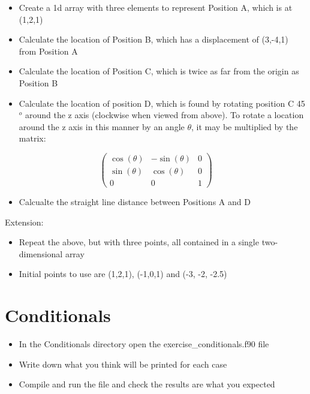 \documentclass[11pt,a4paper]{article}
\begin{document}
\begin{itemize}
    \item Create a 1d array with three elements to represent Position A, which is at (1,2,1)
    \item Calculate the location of Position B, which has a displacement of (3,-4,1) from Position A
    \item Calculate the location of Position C, which is twice as far from the origin as Position B
    \item Calculate the location of position D, which is found by rotating position C 45$^{o}$ around the z axis (clockwise when viewed from above). To rotate a location around the z axis in this manner by an angle $\theta$, it may be multiplied by the matrix:
\end{itemize}

\begin{equation}
\begin{pmatrix}
\cos{(\theta)} & -\sin{(\theta)} & 0\\
\sin{(\theta)} & \cos{(\theta)} & 0 \\
0 & 0 & 1
\end{pmatrix}
\end{equation}

\begin{itemize}
    \item Calcualte the straight line distance between Positions A and D
\end{itemize}

Extension:
\begin{itemize}
    \item Repeat the above, but with three points, all contained in a single two-dimensional array
    \item Initial points to use are (1,2,1), (-1,0,1) and (-3, -2, -2.5)
\end{itemize}

\section{Conditionals}
\begin{itemize}
    \item In the Conditionals directory open the exercise\_conditionals.f90 file
    \item Write down what you think will be printed for each case
    \item Compile and run the file and check the results are what you expected
\end{itemize}
\end{document}

